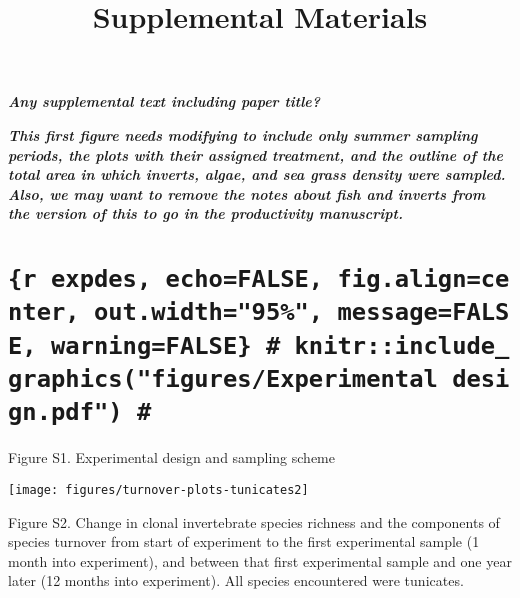 \documentclass[
]{article}
\title{Supplemental Materials}
\author{}
\date{\vspace{-2.5em}}
\begin{document}
\maketitle

\textbf{\emph{Any supplemental text including paper title?}}

\textbf{\emph{This first figure needs modifying to include only summer sampling periods, the plots with their assigned treatment, and the outline of the total area in which inverts, algae, and sea grass density were sampled. Also, we may want to remove the notes about fish and inverts from the version of this to go in the productivity manuscript.}}

\hypertarget{r-expdes-echofalse-fig.aligncenter-out.width95-messagefalse-warningfalse-knitrinclude_graphicsfiguresexperimental-design.pdf}{%
\section{\texorpdfstring{\texttt{\{r\ expdes,\ echo=FALSE,\ fig.align=\textquotesingle{}center\textquotesingle{},\ out.width="95\%",\ message=FALSE,\ warning=FALSE\}\ \#\ knitr::include\_graphics("figures/Experimental\ design.pdf")\ \#}}{\{r expdes, echo=FALSE, fig.align='center', out.width="95\%", message=FALSE, warning=FALSE\} \# knitr::include\_graphics("figures/Experimental design.pdf") \#}}\label{r-expdes-echofalse-fig.aligncenter-out.width95-messagefalse-warningfalse-knitrinclude_graphicsfiguresexperimental-design.pdf}}

Figure S1. Experimental design and sampling scheme

\clearpage

\begin{center}\texttt{[image: figures/turnover-plots-tunicates2]} \end{center}

Figure S2. Change in clonal invertebrate species richness and the components of species turnover from start of experiment to the first experimental sample (1 month into experiment), and between that first experimental sample and one year later (12 months into experiment). All species encountered were tunicates.

\clearpage

\captionsetup[table]{labelformat=empty}
\end{document}
